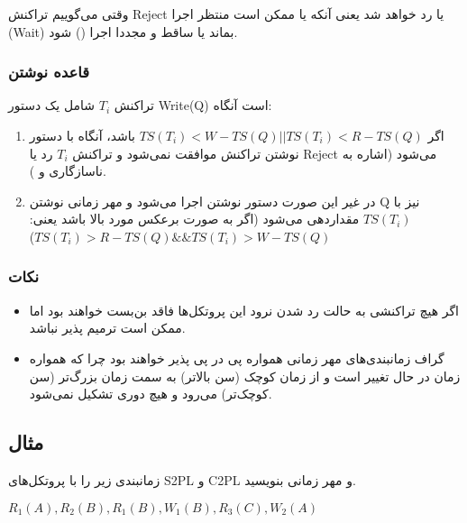 وقتی می‌گوییم تراکنش Reject یا رد خواهد شد یعنی آنکه یا ممکن است منتظر اجرا
(Wait) بماند یا ساقط و مجددا اجرا () شود.

\subsubsection{قاعده نوشتن}

تراکنش $T_i$ شامل یک دستور Write(Q) است آنگاه:

\begin{enumerate}
    \item اگر $TS(T_i) < W-TS(Q) || TS(T_i) < R-TS(Q)$ باشد، آنگاه با دستور
    نوشتن تراکنش موافقت نمی‌شود و تراکنش $T_i$ رد یا Reject می‌شود (اشاره به
    ناسازگاری  و ).

    \item در غیر این صورت دستور نوشتن اجرا می‌شود و مهر زمانی نوشتن Q نیز با
    $TS(T_i)$ مقداردهی می‌شود (اگر به صورت برعکس مورد بالا باشد یعنی: $TS(T_i) >
    R-TS(Q) \&\& TS(T_i) > W-TS(Q) $)
\end{enumerate}

\subsubsection*{نکات}

\begin{itemize}
    \item اگر هیچ تراکنشی به حالت رد شدن نرود این پروتکل‌ها فاقد بن‌بست خواهند
    بود اما ممکن است ترمیم پذیر نباشد.

    \item گراف زمانبندی‌های مهر زمانی همواره پی در پی پذیر خواهند بود چرا که
    همواره زمان در حال تغییر است و از زمان کوچک (سن بالاتر) به سمت زمان بزرگ‌تر
    (سن کوچک‌تر) می‌رود و هیچ دوری تشکیل نمی‌شود.
\end{itemize}

\subsection*{مثال}

زمانبندی زیر را با پروتکل‌های S2PL و C2PL و مهر زمانی بنویسید.

\begin{LTR}
    \centering
    $R_1(A),R_2(B),R_1(B),W_1(B),R_3(C),W_2(A)$
\end{LTR}

\newpage